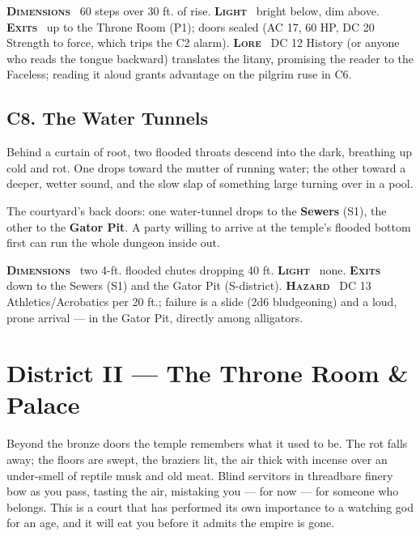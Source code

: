 \documentclass[10pt,twoside]{article}
\newcommand{\tech}[1]{\textbf{\scshape\textcolor{stone}{#1}}\ }
\begin{document}
\begin{techbox}
\tech{Dimensions} 60 steps over 30 ft. of rise. \tech{Light} bright below, dim above.
\tech{Exits} up to the Throne Room (P1); doors sealed (AC 17, 60 HP, DC 20 Strength
to force, which trips the C2 alarm). \tech{Lore} DC 12 History (or anyone who reads
the tongue backward) translates the litany, promising the reader to the Faceless;
reading it aloud grants advantage on the pilgrim ruse in C6.
\end{techbox}

\subsection{C8. The Water Tunnels}
\begin{readaloud}
Behind a curtain of root, two flooded throats descend into the dark, breathing up
cold and rot. One drops toward the mutter of running water; the other toward a
deeper, wetter sound, and the slow slap of something large turning over in a pool.
\end{readaloud}
The courtyard's back doors: one water-tunnel drops to the \textbf{Sewers} (S1), the
other to the \textbf{Gator Pit}. A party willing to arrive at the temple's flooded
bottom first can run the whole dungeon inside out.

\begin{techbox}
\tech{Dimensions} two 4-ft. flooded chutes dropping 40 ft. \tech{Light} none.
\tech{Exits} down to the Sewers (S1) and the Gator Pit (S-district). \tech{Hazard}
DC 13 Athletics/Acrobatics per 20 ft.; failure is a slide (2d6 bludgeoning) and a
loud, prone arrival --- in the Gator Pit, directly among alligators.
\end{techbox}
\clearpage
\section{District II --- The Throne Room \& Palace}

\begin{readaloud}
Beyond the bronze doors the temple remembers what it used to be. The rot falls away;
the floors are swept, the braziers lit, the air thick with incense over an
under-smell of reptile musk and old meat. Blind servitors in threadbare finery bow
as you pass, tasting the air, mistaking you --- for now --- for someone who belongs.
This is a court that has performed its own importance to a watching god for an age,
and it will eat you before it admits the empire is gone.
\end{readaloud}
\end{document}
